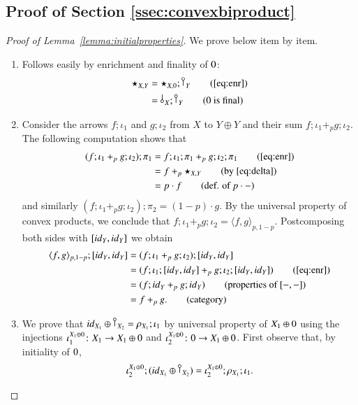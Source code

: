 %
%
%
%
%
%

\subsection{Proof of Section \ref{ssec:convexbiproduct}}

\begin{proof}[Proof of Lemma~\ref{lemma:initialproperties}]
We prove below item by item.
\begin{enumerate}
\item Follows easily by enrichment and finality of $0$: 
\begin{align*}
\star_{X,Y} & = \star_{X,\zero} ; \cobang{Y} \tag{\ref{eq:enr}}\\
&= \bang{X};\cobang{Y} \tag{$\zero$ is final}
\end{align*}
\item Consider the arrows $f;\iota_1$ and $g;\iota_2$ from $X$ to $Y\oplus Y$ and their sum $f;\iota_1 +_p g;\iota_2$. The following computation shows that 
    \begin{align}
        (f;\iota_1 +_p g;\iota_2);\pi_1 & = f;\iota_1;\pi_1 +_p g;\iota_2;\pi_1 \tag{\ref{eq:enr}}\\
        & = f +_p \star_{X,Y} \tag{by \eqref{eq:delta}}\\
        & = p \cdot f \tag{def. of $p\cdot -$}
    \end{align} 
    and similarly $(f;\iota_1 +_p g;\iota_2);\pi_2 = (1-p)\cdot g$. By the universal property of convex products, we conclude that $f;\iota_1 +_p g;\iota_2 = \langle f,g \rangle_{p,1-p}$. Postcomposing both sides with $[{id}_{Y},{id}_{Y}]$ we obtain 
    \begin{align}
        \langle f,g \rangle_{p,1-p};[\id{Y},\id{Y}] & = (f;\iota_1 +_p g;\iota_2);[\id{Y},\id{Y}] \notag\\
        &= (f;\iota_1 ;[\id{Y},\id{Y}] +_p g;\iota_2 ;[\id{Y},\id{Y}]) \tag{\ref{eq:enr}}\\
        &=(f ;\id{Y} +_p g ; \id{Y}) \tag{properties of $[-,-]$}\\
        & = f +_p g.   \tag{category}
    \end{align}
\item We prove that $ \id{X_1}\oplus \cobang{X_2}=\runit{X_1}; \iota_1$ by universal property of $X_1\oplus 0$ using the injections $\iota_1^{X_1\oplus0} \colon X_1 \to X_1\oplus 0$ and 
$\iota_2^{X_1\oplus0} \colon 0 \to X_1\oplus 0$. First observe that, by initiality of $0$,
 \[\iota_2^{X_1\oplus \zero}; (\id{X_1}\oplus \cobang{X_2}) = \iota_2^{X_1\oplus \zero}; \runit{X_1}; \iota_1 \text{.} \]

\end{enumerate}
\end{proof}
